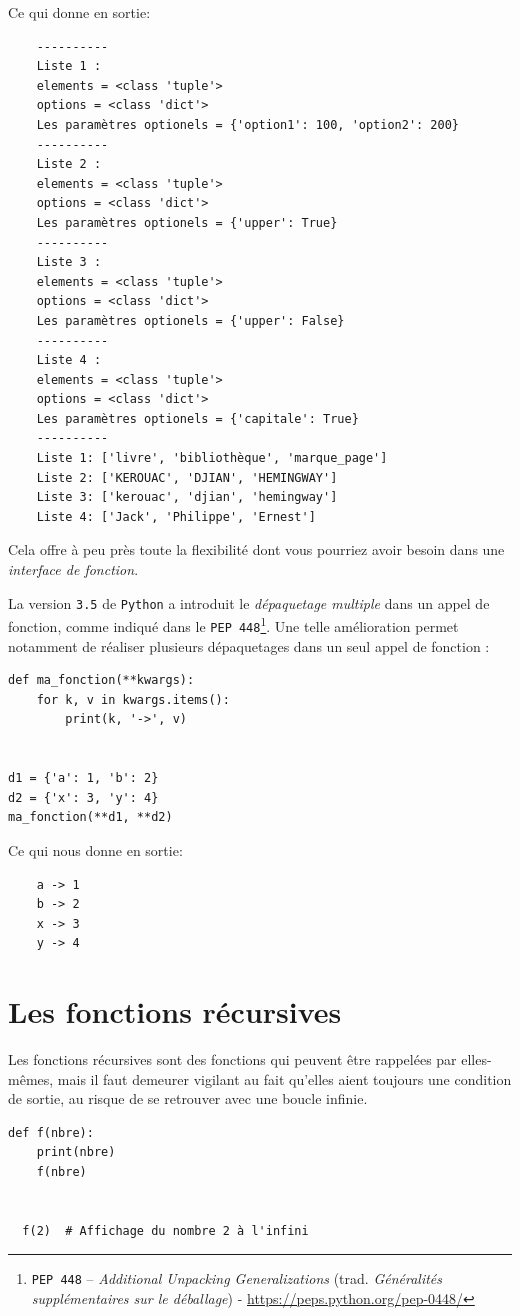 \documentclass[a4paper,11pt]{book}
\begin{document}
Ce qui donne en sortie:
\begin{verbatim}
    ----------
    Liste 1 : 
    elements = <class 'tuple'>
    options = <class 'dict'>
    Les paramètres optionels = {'option1': 100, 'option2': 200}
    ----------
    Liste 2 : 
    elements = <class 'tuple'>
    options = <class 'dict'>
    Les paramètres optionels = {'upper': True}
    ----------
    Liste 3 : 
    elements = <class 'tuple'>
    options = <class 'dict'>
    Les paramètres optionels = {'upper': False}
    ----------
    Liste 4 : 
    elements = <class 'tuple'>
    options = <class 'dict'>
    Les paramètres optionels = {'capitale': True}
    ----------
    Liste 1: ['livre', 'bibliothèque', 'marque_page']
    Liste 2: ['KEROUAC', 'DJIAN', 'HEMINGWAY']
    Liste 3: ['kerouac', 'djian', 'hemingway']
    Liste 4: ['Jack', 'Philippe', 'Ernest']   
\end{verbatim}
\medskip

Cela offre à peu près toute la flexibilité dont vous pourriez avoir besoin dans une \textit{interface de fonction}.
\medskip

La version \texttt{3.5} de \texttt{Python} a introduit le \textit{dépaquetage multiple} dans un appel de fonction, comme indiqué dans le \texttt{PEP 448}\footnote{\texttt{PEP 448} – \textit{Additional Unpacking Generalizations} (trad. \og \textit{Généralités supplémentaires sur le déballage}\fg{}) - \url{https://peps.python.org/pep-0448/}}. Une telle amélioration permet notamment de réaliser plusieurs dépaquetages dans un seul appel de fonction :
\begin{lstlisting}[caption=Dépaquetage multiple]
def ma_fonction(**kwargs):
    for k, v in kwargs.items():
        print(k, '->', v)


d1 = {'a': 1, 'b': 2}
d2 = {'x': 3, 'y': 4}
ma_fonction(**d1, **d2)
\end{lstlisting}
\medskip

Ce qui nous donne en sortie:
\begin{verbatim}
    a -> 1
    b -> 2
    x -> 3
    y -> 4
\end{verbatim}
\medskip

\section{Les fonctions récursives}
Les fonctions récursives sont des fonctions qui peuvent être rappelées par elles-mêmes, mais il faut demeurer vigilant au fait qu'elles aient toujours une condition de sortie, au risque de se retrouver avec une boucle infinie.
\begin{lstlisting}[caption=Exemple de boucle sans fin]
  def f(nbre):
    print(nbre)
    f(nbre)


  f(2)  # Affichage du nombre 2 à l'infini
\end{lstlisting}
\medskip
 
\end{document}
